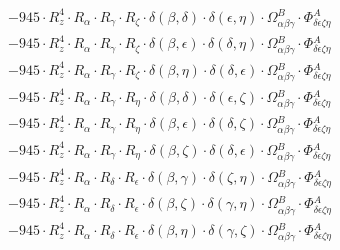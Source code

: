 \documentclass{article}
\begin{document}
\begin{equation}
\begin{array}{c}
 \\[0.2em] 		 - 945 \cdot R_{z}^{4} \cdot R_{\alpha{}} \cdot R_{\gamma{}} \cdot R_{\zeta{}} \cdot \delta{}\left(\beta{}, \delta{}\right) \cdot \delta{}\left(\epsilon{}, \eta{}\right) \cdot \Omega{}^{B}_{\alpha{}\beta{}\gamma{}} \cdot \Phi{}^{A}_{\delta{}\epsilon{}\zeta{}\eta{}} 
 \\[0.2em] 		 - 945 \cdot R_{z}^{4} \cdot R_{\alpha{}} \cdot R_{\gamma{}} \cdot R_{\zeta{}} \cdot \delta{}\left(\beta{}, \epsilon{}\right) \cdot \delta{}\left(\delta{}, \eta{}\right) \cdot \Omega{}^{B}_{\alpha{}\beta{}\gamma{}} \cdot \Phi{}^{A}_{\delta{}\epsilon{}\zeta{}\eta{}} 
 \\[0.2em] 		 - 945 \cdot R_{z}^{4} \cdot R_{\alpha{}} \cdot R_{\gamma{}} \cdot R_{\zeta{}} \cdot \delta{}\left(\beta{}, \eta{}\right) \cdot \delta{}\left(\delta{}, \epsilon{}\right) \cdot \Omega{}^{B}_{\alpha{}\beta{}\gamma{}} \cdot \Phi{}^{A}_{\delta{}\epsilon{}\zeta{}\eta{}} 
 \\[0.2em] 		 - 945 \cdot R_{z}^{4} \cdot R_{\alpha{}} \cdot R_{\gamma{}} \cdot R_{\eta{}} \cdot \delta{}\left(\beta{}, \delta{}\right) \cdot \delta{}\left(\epsilon{}, \zeta{}\right) \cdot \Omega{}^{B}_{\alpha{}\beta{}\gamma{}} \cdot \Phi{}^{A}_{\delta{}\epsilon{}\zeta{}\eta{}} 
 \\[0.2em] 		 - 945 \cdot R_{z}^{4} \cdot R_{\alpha{}} \cdot R_{\gamma{}} \cdot R_{\eta{}} \cdot \delta{}\left(\beta{}, \epsilon{}\right) \cdot \delta{}\left(\delta{}, \zeta{}\right) \cdot \Omega{}^{B}_{\alpha{}\beta{}\gamma{}} \cdot \Phi{}^{A}_{\delta{}\epsilon{}\zeta{}\eta{}} 
 \\[0.2em] 		 - 945 \cdot R_{z}^{4} \cdot R_{\alpha{}} \cdot R_{\gamma{}} \cdot R_{\eta{}} \cdot \delta{}\left(\beta{}, \zeta{}\right) \cdot \delta{}\left(\delta{}, \epsilon{}\right) \cdot \Omega{}^{B}_{\alpha{}\beta{}\gamma{}} \cdot \Phi{}^{A}_{\delta{}\epsilon{}\zeta{}\eta{}} 
 \\[0.2em] 		 - 945 \cdot R_{z}^{4} \cdot R_{\alpha{}} \cdot R_{\delta{}} \cdot R_{\epsilon{}} \cdot \delta{}\left(\beta{}, \gamma{}\right) \cdot \delta{}\left(\zeta{}, \eta{}\right) \cdot \Omega{}^{B}_{\alpha{}\beta{}\gamma{}} \cdot \Phi{}^{A}_{\delta{}\epsilon{}\zeta{}\eta{}} 
 \\[0.2em] 		 - 945 \cdot R_{z}^{4} \cdot R_{\alpha{}} \cdot R_{\delta{}} \cdot R_{\epsilon{}} \cdot \delta{}\left(\beta{}, \zeta{}\right) \cdot \delta{}\left(\gamma{}, \eta{}\right) \cdot \Omega{}^{B}_{\alpha{}\beta{}\gamma{}} \cdot \Phi{}^{A}_{\delta{}\epsilon{}\zeta{}\eta{}} 
 \\[0.2em] 		 - 945 \cdot R_{z}^{4} \cdot R_{\alpha{}} \cdot R_{\delta{}} \cdot R_{\epsilon{}} \cdot \delta{}\left(\beta{}, \eta{}\right) \cdot \delta{}\left(\gamma{}, \zeta{}\right) \cdot \Omega{}^{B}_{\alpha{}\beta{}\gamma{}} \cdot \Phi{}^{A}_{\delta{}\epsilon{}\zeta{}\eta{}} 

\end{array}
\end{equation}
\end{document}
